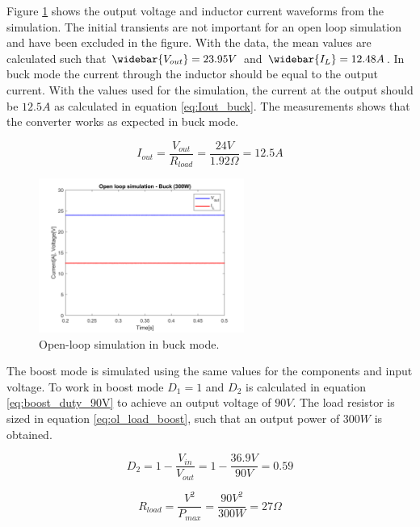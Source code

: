 Figure \ref{fig:OL_bucksimulation} shows the output voltage and inductor current waveforms from the simulation. The initial transients are not important for an open loop simulation and have been excluded in the figure. With the data, the mean values are calculated such that $\widebar{V_{out}} = 23.95V$ and $\widebar{I_L} = 12.48A$. In buck mode the current through the inductor should be equal to the output current. With the values used for the simulation, the current at the output should be $12.5A$ as calculated in equation \ref{eq:Iout_buck}. The measurements shows that the converter works as expected in buck mode.

\begin{equation} \label{eq:Iout_buck}
I_{out} = \frac{V_{out}}{R_{load}} = \frac{24V}{1.92\Omega} = 12.5A
\end{equation}   

\begin{figure}[H]
 	\begin{center}
 		\includegraphics[width=0.6\textwidth]{../Pictures/P1/Open_loop_simulation/open_loop_buck_300W}
 		\caption{Open-loop simulation in buck mode.}
 		\label{fig:OL_bucksimulation}
 	\end{center}
\end{figure} 


The boost mode is simulated using the same values for the components and input voltage. To work in boost mode $D_1 = 1$ and $D_2$ is calculated in equation \ref{eq:boost_duty_90V} to achieve an output voltage of $90V$. The load resistor is sized in equation \ref{eq:ol_load_boost}, such that an output power of $300W$ is obtained.

\begin{equation} \label{eq:boost_duty_90V}
	D_2 = 1-\frac{V_{in}}{V_{out}} = 1 - \frac{36.9V}{90V} = 0.59
\end{equation}

\begin{equation} \label{eq:ol_load_boost}
	R_{load} = \frac{V^2}{P_{max}} = \frac{90V^2}{300W} = 27 \Omega
\end{equation}

